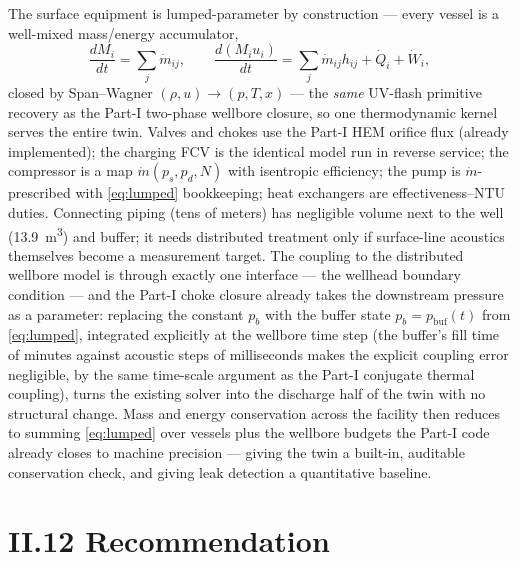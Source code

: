 The surface equipment is lumped-parameter by construction --- every
vessel is a well-mixed mass/energy accumulator,
\begin{equation}
\frac{dM_i}{dt} = \sum_j \dot m_{ij},
\qquad
\frac{d(M_i u_i)}{dt} = \sum_j \dot m_{ij} h_{ij}
 + \dot Q_i + \dot W_i,
\label{eq:lumped}
\end{equation}
closed by Span--Wagner $(\rho, u) \to (p, T, x)$ --- the \emph{same}
UV-flash primitive recovery as the Part-I two-phase wellbore closure,
so one thermodynamic kernel serves the entire twin. Valves and chokes
use the Part-I HEM orifice flux (already implemented); the
charging FCV is the identical model run in reverse service; the
compressor is a map $\dot m(p_s, p_d, N)$ with isentropic efficiency;
the pump is $\dot m$-prescribed with \cref{eq:lumped} bookkeeping;
heat exchangers are effectiveness--NTU duties. Connecting piping
(tens of meters) has negligible volume next to the well
(\SI{13.9}{m^3}) and buffer; it needs distributed treatment only if
surface-line acoustics themselves become a measurement target. The
coupling to the distributed wellbore model is through exactly one
interface --- the wellhead boundary condition --- and the Part-I
choke closure already takes the downstream pressure as a parameter:
replacing the constant $p_b$ with the buffer state
$p_b = p_{\mathrm{buf}}(t)$ from \cref{eq:lumped}, integrated
explicitly at the wellbore time step (the buffer's fill time of
minutes against acoustic steps of milliseconds makes the explicit
coupling error negligible, by the same time-scale argument as the
Part-I conjugate thermal coupling), turns the existing solver into
the discharge half of the twin with no structural change. Mass and
energy conservation across the facility then reduces to summing
\cref{eq:lumped} over vessels plus the wellbore budgets the Part-I
code already closes to machine precision --- giving the twin a
built-in, auditable conservation check, and giving leak detection a
quantitative baseline.

\section{II.12 Recommendation}


